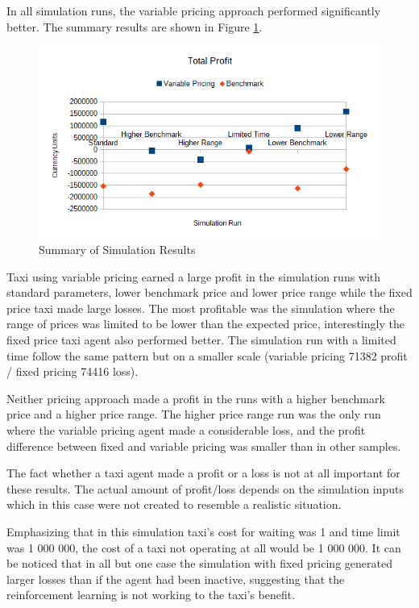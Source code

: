 In all simulation runs, the variable pricing approach performed significantly
better. The summary results are shown in Figure \ref{figure:results:summary}.

\begin{figure}
\begin{center}
  \includegraphics[width=\textwidth]{../figures/results_summary}
  \caption{
    Summary of Simulation Results
    \label{figure:results:summary}
  }
\end{center}
\end{figure}

Taxi using variable pricing earned a large profit in the simulation runs with
standard parameters, lower benchmark price and lower price range while the
fixed price taxi made large losses. The most profitable was the simulation
where the range of prices was limited to be lower than the expected price,
interestingly the fixed price taxi agent also performed better. The simulation
run with a limited time follow the same pattern but on a smaller scale
(variable pricing 71382 profit / fixed pricing 74416 loss).

Neither pricing approach made a profit in the runs with a higher benchmark
price and a higher price range. The higher price range run was the only run
where the variable pricing agent made a considerable loss, and the profit
difference between fixed and variable pricing was smaller than in other
samples.

The fact whether a taxi agent made a profit or a loss is not at all important
for these results. The actual amount of profit/loss depends on the simulation
inputs which in this case were not created to resemble a realistic situation.

Emphasizing that in this simulation taxi's cost for waiting was 1 and time
limit was 1 000 000, the cost of a taxi not operating at all would be 1 000
000. It can be noticed that in all but one case the simulation with fixed
pricing generated larger losses than if the agent had been inactive, suggesting
that the reinforcement learning is not working to the taxi's benefit.

